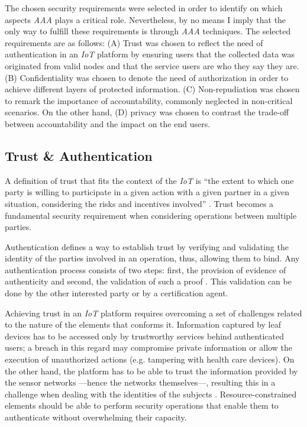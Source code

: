 \documentclass[journal]{IEEEtran}
\begin{document}
  The chosen security requirements were selected in order to identify on which aspects \emph{AAA} plays a critical role. Nevertheless, by no means I imply that the only way to fulfill these requirements is through \emph{AAA} techniques. The selected requirements are as follows: (A) Trust was chosen to reflect the need of authentication in an \emph{IoT} platform by ensuring users that the collected data was originated from valid nodes and that the service users are who they say they are. (B) Confidentiality was chosen to denote the need of authorization in order to achieve different layers of protected information. (C) Non-repudiation was chosen to remark the importance of accountability, commonly neglected in non-critical scenarios. On the other hand, (D) privacy was chosen to contrast the trade-off between accountability and the impact on the end users.

  \subsection{Trust \& Authentication}
  A definition of trust that fits the context of the \emph{IoT} is ``the extent to which one party is willing to participate in a given action with a given partner in a given situation, considering the risks and incentives involved'' \cite{Ruohomaa2006}. Trust becomes a fundamental security requirement when considering operations between multiple parties.

  Authentication defines a way to establish trust by verifying and validating the identity of the parties involved in an operation, thus, allowing them to bind. Any authentication process consists of two steps: first, the provision of evidence of authenticity and second, the validation of such a proof \cite{Sklavos2007}. This validation can be done by the other interested party or by a certification agent.

  Achieving trust in an \emph{IoT} platform requires overcoming a set of challenges related to the nature of the elements that conforms it. Information captured by leaf devices has to be accessed only by trustworthy services behind authenticated users; a breach in this regard may compromise private information or allow the execution of unauthorized actions (e.g. tampering with health care devices). On the other hand, the platform has to be able to trust the information provided by the sensor networks ---hence the networks themselves---, resulting this in a challenge when dealing with the identities of the subjects \cite{Kanuparthi2013}. Resource-constrained elements should be able to perform security operations that enable them to authenticate without overwhelming their capacity. 
\end{document}
